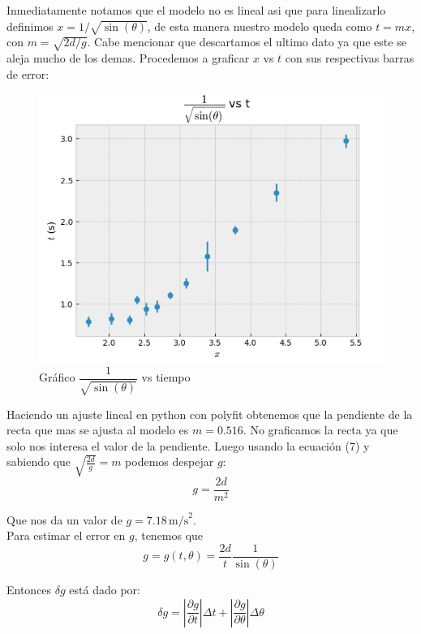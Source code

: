 \documentclass{article}
\begin{document}
Inmediatamente notamos que el modelo no es lineal asi que para linealizarlo definimos 
$x = 1/\sqrt{\sin(\theta)}$, de esta manera nuestro modelo queda como 
$t = m x$, con $m = \sqrt{2d/g}$. Cabe mencionar que descartamos el ultimo
dato ya que este se aleja mucho de los demas. Procedemos a graficar $x$ vs 
$t$ con sus respectivas barras de error:
\begin{figure}[H]
\centering
\includegraphics[scale=0.55]{img/grafico2.png}
\caption{Gráfico $\dfrac{1}{\sqrt{\sin(\theta)}}$ vs tiempo}
\label{fig:ajuste-lineal}
\end{figure}

Haciendo un ajuste lineal en python con polyfit obtenemos que la pendiente 
de la recta que mas se ajusta al modelo es $m = 0.516$. No graficamos la
recta ya que solo nos interesa el valor de la pendiente. Luego usando la 
ecuación (7) y sabiendo que $\sqrt{\frac{2d}{g}} = m$ podemos despejar $g$:
\begin{equation}
   g = \dfrac{2d}{m^2}
\end{equation}

Que nos da un valor de $g = 7.18 \, \text{m/s}^2$. \\

Para estimar el error en $g$, tenemos que 
\begin{equation}
   g = g(t,\theta) = \dfrac{2d}{t} \dfrac{1}{\sin(\theta)}
\end{equation}

Entonces $\delta g$ está dado por:
\begin{equation}
   \delta g = \left| \dfrac{\partial g}{\partial t} 
   \right| \Delta t + \left| \dfrac{\partial g}{\partial \theta} \right| 
   \Delta \theta
\end{equation}
\end{document}
